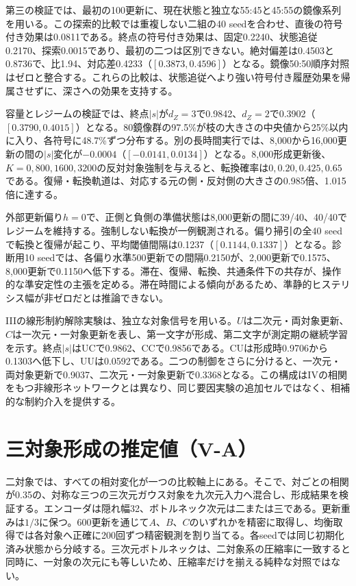 第三の検証では、最初の100更新に、現在状態と独立な55:45と45:55の鏡像系列を用いる。この探索的比較では重複しない二組の40 seedを合わせ、直後の符号付き効果は0.0811である。終点の符号付き効果は、固定0.2240、状態追従0.2170、探索0.0015であり、最初の二つは区別できない。絶対偏差は0.4503と0.8736で、比1.94、対応差0.4233（$[0.3873,0.4596]$）となる。鏡像50:50順序対照はゼロと整合する。これらの比較は、状態追従へより強い符号付き履歴効果を帰属させずに、深さへの効果を支持する。

容量とレジームの検証では、終点$|s|$が$d_Z=3$で0.9842、$d_Z=2$で0.3902（$[0.3790,0.4015]$）となる。80鏡像群の97.5\%が枝の大きさの中央値から25\%以内に入り、各符号に48.7\%ずつ分布する。別の長時間実行では、8,000から16,000更新の間の$|s|$変化が$-0.0004$（$[-0.0141,0.0134]$）となる。8,000形成更新後、$K=0,800,1600,3200$の反対対象強制を与えると、転換確率は$0,0.20,0.425,0.65$である。復帰・転換軌道は、対応する元の側・反対側の大きさの0.985倍、1.015倍に達する。

外部更新偏り$h=0$で、正側と負側の準備状態は8,000更新の間に39/40、40/40でレジームを維持する。強制しない転換が一例観測される。偏り掃引の全40 seedで転換と復帰が起こり、平均閾値間隔は0.1237（$[0.1144,0.1337]$）となる。診断用10 seedでは、各偏り水準500更新での間隔0.2150が、2,000更新で0.1575、8,000更新で0.1150へ低下する。滞在、復帰、転換、共通条件下の共存が、操作的な準安定性の主張を定める。滞在時間による傾向があるため、準静的ヒステリシス幅が非ゼロだとは推論できない。

IIIの線形制約解除実験は、独立な対象信号を用いる。$U$は二次元・両対象更新、$C$は一次元・一対象更新を表し、第一文字が形成、第二文字が測定期の継続学習を示す。終点$|s|$はUCで0.9862、CCで0.9856である。CUは形成時0.9706から0.1303へ低下し、UUは0.0592である。二つの制御をさらに分けると、一次元・両対象更新で0.9037、二次元・一対象更新で0.3368となる。この構成はIVの相関をもつ非線形ネットワークとは異なり、同じ要因実験の追加セルではなく、相補的な制約介入を提供する。


\section{三対象形成の推定値（V-A）}
\label{app:three}
\label{sec:three}
二対象では、すべての相対変化が一つの比較軸上にある。そこで、対ごとの相関が0.35の、対称な三つの三次元ガウス対象を九次元入力へ混合し、形成結果を検証する。エンコーダは隠れ幅32、ボトルネック次元は二または三である。更新重みは$1/3$に保つ。600更新を通じて$A$、$B$、$C$のいずれかを精密に取得し、均衡取得では各対象へ正確に200回ずつ精密観測を割り当てる。各seedでは同じ初期化済み状態から分岐する。三次元ボトルネックは、二対象系の圧縮率に一致すると同時に、一対象の次元にも等しいため、圧縮率だけを揃える純粋な対照ではない。


